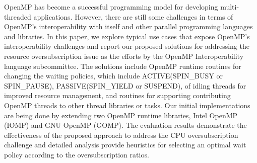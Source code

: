 OpenMP has become a successful programming model
for developing multi-threaded applications.
However, there are still some challenges in terms of OpenMP's interoperability
with itself and other parallel programming languages and libraries.
In this paper, we explore typical use cases that expose OpenMP's interoperability challenges and
report our proposed solutions for addressing the resource oversubscription issue as the efforts
by the OpenMP Interoperability language subcommittee. 
The solutions include OpenMP runtime routines for
changing the waiting policies, which include ACTIVE(SPIN\_BUSY or SPIN\_PAUSE), 
PASSIVE(SPIN\_YIELD or SUSPEND), 
of idling threads for improved resource management, and 
routines for supporting contributing OpenMP threads to other thread libraries or tasks. 
Our initial implementations are being done by extending two OpenMP runtime libraries, 
Intel OpenMP (IOMP) and GNU OpenMP (GOMP).
The evaluation results demonstrate the effectiveness of the proposed approach to address the CPU 
oversubscription challenge and detailed analysis provide heuristics for selecting an optimal wait policy according
to the oversubscription ratios. 


